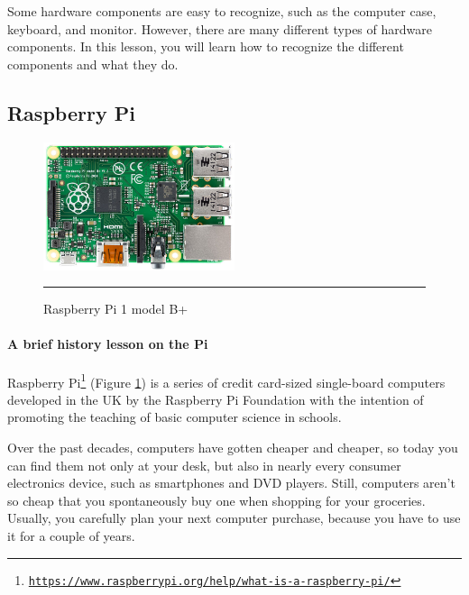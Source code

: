 Some hardware components are easy to recognize, such as the computer case, keyboard, and monitor. However, there are many different types of hardware components. In this lesson, you will learn how to recognize the different components and what they do.



\subsection{Raspberry Pi}
\begin{figure}
  \begin{center}
    \includegraphics[width=0.5\textwidth]{./Pictures/raspberry_pi_b.jpg}
  \end{center}
  \rule{0.5\textwidth}{0.5pt}
  \caption{Raspberry Pi 1 model B+}
  \label{fig:Raspberry}
\end{figure}
\paragraph*{A brief history lesson on the Pi}
\hfill \break
Raspberry Pi\footnote{\href{https://www.raspberrypi.org/help/what-is-a-raspberry-pi/}{\texttt{https://www.raspberrypi.org/help/what-is-a-raspberry-pi/}}} (Figure \ref{fig:Raspberry}) is a series of credit card-sized single-board computers developed in the UK by the Raspberry Pi Foundation with the intention of promoting the teaching of basic computer science in schools.

Over the past decades, computers have gotten cheaper and cheaper, so today
you can find them not only at your desk, but also in nearly every consumer
electronics device, such as smartphones and DVD players. Still, computers
aren’t so cheap that you spontaneously buy one when shopping for your
groceries. Usually, you carefully plan your next computer purchase, because
you have to use it for a couple of years.

